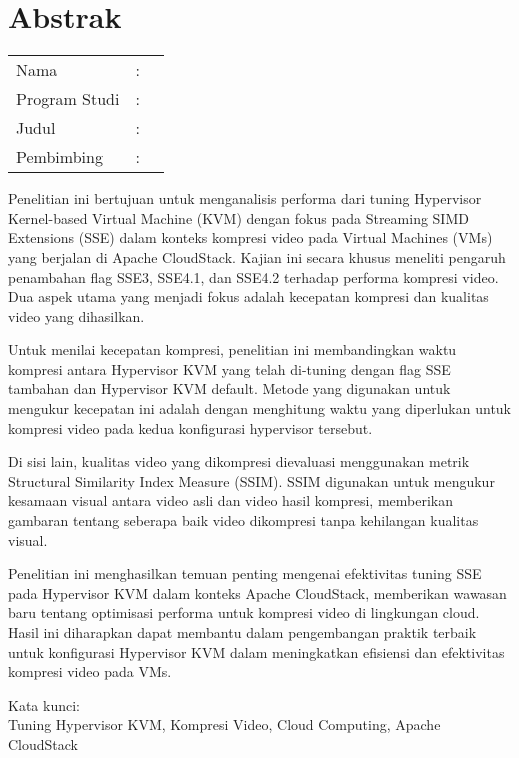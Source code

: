 %
%
%

\chapter*{Abstrak}

\vspace*{0.2cm}
{
	\setlength{\parindent}{0pt}
	
	\begin{tabular}{@{}l l p{10cm}}
		Nama&: & \penulis \\
		Program Studi&: & \program \\
		Judul&: & \judul \\
		Pembimbing&: & \pembimbing \\
	\end{tabular}

	\bigskip
	\bigskip
	
	Penelitian ini bertujuan untuk menganalisis performa dari tuning Hypervisor Kernel-based Virtual Machine (KVM) dengan fokus pada Streaming SIMD Extensions (SSE) dalam konteks kompresi video pada Virtual Machines (VMs) yang berjalan di Apache CloudStack. Kajian ini secara khusus meneliti pengaruh penambahan flag SSE3, SSE4.1, dan SSE4.2 terhadap performa kompresi video. Dua aspek utama yang menjadi fokus adalah kecepatan kompresi dan kualitas video yang dihasilkan.
	
	Untuk menilai kecepatan kompresi, penelitian ini membandingkan waktu kompresi antara Hypervisor KVM yang telah di-tuning dengan flag SSE tambahan dan Hypervisor KVM default. Metode yang digunakan untuk mengukur kecepatan ini adalah dengan menghitung waktu yang diperlukan untuk kompresi video pada kedua konfigurasi hypervisor tersebut.
	
	Di sisi lain, kualitas video yang dikompresi dievaluasi menggunakan metrik Structural Similarity Index Measure (SSIM). SSIM digunakan untuk mengukur kesamaan visual antara video asli dan video hasil kompresi, memberikan gambaran tentang seberapa baik video dikompresi tanpa kehilangan kualitas visual.
	
	Penelitian ini menghasilkan temuan penting mengenai efektivitas tuning SSE pada Hypervisor KVM dalam konteks Apache CloudStack, memberikan wawasan baru tentang optimisasi performa untuk kompresi video di lingkungan cloud. Hasil ini diharapkan dapat membantu dalam pengembangan praktik terbaik untuk konfigurasi Hypervisor KVM dalam meningkatkan efisiensi dan efektivitas kompresi video pada VMs.

	\bigskip

	Kata kunci:\\
	Tuning Hypervisor KVM, Kompresi Video, Cloud Computing, Apache CloudStack
}

\newpage